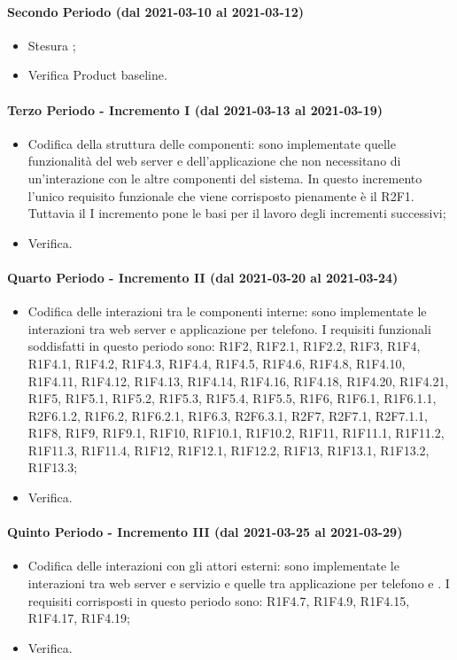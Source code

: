 \paragraph{Secondo Periodo (dal 2021-03-10 al 2021-03-12)}
\begin{itemize}
	\item Stesura  ;
	\item Verifica Product baseline.
\end{itemize}

\paragraph{Terzo Periodo - Incremento I (dal 2021-03-13 al 2021-03-19)}
\begin{itemize}
	\item Codifica della struttura delle componenti: sono implementate quelle funzionalità del web server e dell'applicazione che non necessitano di un'interazione con le altre componenti del sistema. In questo incremento l'unico requisito funzionale che viene corrisposto pienamente è il R2F1. Tuttavia il I incremento pone le basi per il lavoro degli incrementi successivi;
	\item Verifica.
\end{itemize}

\paragraph{Quarto Periodo - Incremento II (dal 2021-03-20 al 2021-03-24)}
\begin{itemize}
	\item  Codifica delle interazioni tra le componenti interne: sono implementate le interazioni tra web server e applicazione per telefono. I requisiti funzionali soddisfatti in questo periodo sono: R1F2, R1F2.1, R1F2.2, R1F3, R1F4, R1F4.1, R1F4.2, R1F4.3, R1F4.4, R1F4.5, R1F4.6, R1F4.8, R1F4.10, R1F4.11, R1F4.12, R1F4.13, R1F4.14, R1F4.16, R1F4.18, R1F4.20, R1F4.21, R1F5, R1F5.1, R1F5.2, R1F5.3, R1F5.4, R1F5.5, R1F6, R1F6.1, R1F6.1.1, R2F6.1.2, R1F6.2, R1F6.2.1, R1F6.3, R2F6.3.1, R2F7, R2F7.1, R2F7.1.1, R1F8, R1F9, R1F9.1, R1F10, R1F10.1, R1F10.2, R1F11, R1F11.1, R1F11.2, R1F11.3, R1F11.4, R1F12, R1F12.1, R1F12.2, R1F13, R1F13.1, R1F13.2, R1F13.3;
	\item Verifica.
\end{itemize}

\paragraph{Quinto Periodo - Incremento III (dal 2021-03-25 al 2021-03-29)}
\begin{itemize}
	\item Codifica delle interazioni con gli attori esterni: sono implementate le interazioni tra web server e servizio  e quelle tra applicazione per telefono e .
	I requisiti corrisposti in questo periodo sono: R1F4.7, R1F4.9, R1F4.15, R1F4.17, R1F4.19;
	\item Verifica.
\end{itemize}

